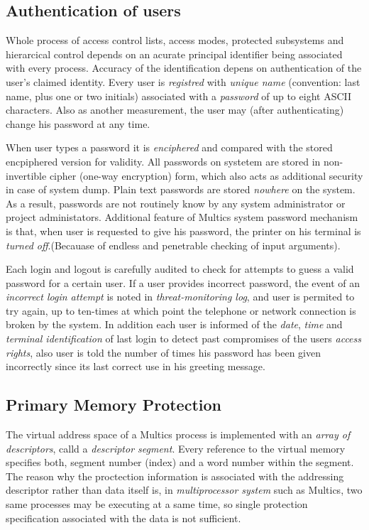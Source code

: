 \subsection{Authentication of users}

Whole process of access control lists, access modes, protected subsystems and hierarcical control depends on an 
acurate principal identifier being associated with every process. Accuracy of the identification depens on 
authentication of the user's claimed identity.
Every user is \textit{registred} with \textit{unique name} (convention: last name, plus one or two initials) 
associated with a \textit{password} of up to eight ASCII characters. Also as another measurement, the user may 
(after authenticating) change his password at any time.

When user types a password it is \textit{enciphered} and compared with the stored encpiphered version for validity.
All passwords on systetem are stored in non-invertible cipher (one-way encryption) form, which also acts as additional 
security in case of system dump. Plain text passwords are stored \textit{nowhere} on the system. As a result, passwords 
are not routinely know by any system administrator or project administators.
Additional feature of Multics system password mechanism is that, when user is requested to give his password, the printer 
on his terminal is \textit{turned off}.(Becauase of endless and penetrable checking of input arguments).


Each login and logout is carefully audited to check for attempts to guess a valid password for a certain user. 
If a user provides incorrect password, the event of an \textit{incorrect login attempt} is noted in \textit{
threat-monitoring log}, and user is permited to try again, up to ten-times at which point the telephone or network 
connection is broken by the system.
In addition each user is informed of the \textit{date}, \textit{time} and \textit{terminal identification} of last
login to detect past compromises of the users \textit{access rights}, also user is told the number of times his password 
has been given incorrectly since its last correct use in his greeting message. 


\subsection{Primary Memory Protection}

The virtual address space of a Multics process is implemented with an \textit{array of descriptors}, calld 
a \textit{descriptor segment}. Every reference to the virtual memory specifies both, segment number (index) and a 
word number within the segment.
The reason why the proctection information is associated with the addressing descriptor rather than data itself is, 
in \textit{multiprocessor system} such as Multics, two same processes may be executing at a same time, so single 
protection specification associated with the data is not sufficient.

